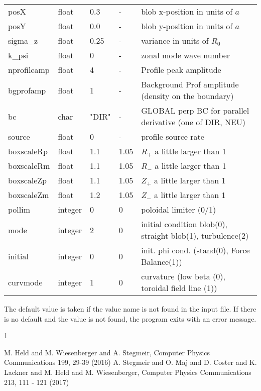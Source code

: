 \documentclass{hitec} %
\renewenvironment{thebibliography}[1]{
  \begin{oldthebibliography}{#1}
    \RaggedRight %
    \setlength{\itemsep}{0em}
    \setlength{\parskip}{0em}
}
{
  \end{oldthebibliography}
}
\begin{document}
\begin{longtable}{llll>{\RaggedRight}p{7cm}}
posX       & float &0.3    & - & blob x-position in units of $a$\\
posY       & float &0.0    & - & blob y-position in units of $a$ \\
sigma\_z    & float &0.25   & - & variance in units of $R_0$  \\
k\_psi     & float &0    & - & zonal mode wave number  \\
nprofileamp& float &4   & - & Profile peak amplitude \\
bgprofamp  & float &1   & - & Background Prof amplitude (density on the boundary) \\
bc  & char & "DIR"      & - & GLOBAL perp BC for parallel derivative (one of  DIR, NEU) \\
source  & float & 0     & - & profile source rate \\
boxscaleRp  & float & 1.1     & 1.05 & $R_+$ a little larger than 1\\
boxscaleRm  & float & 1.1     & 1.05 & $R_-$ a little larger than 1 \\
boxscaleZp  & float & 1.1     & 1.05 & $Z_+$ a little larger than 1 \\
boxscaleZm  & float & 1.2     & 1.05 & $Z_-$ a little larger than 1 \\
pollim    & integer & 0     & 0 & poloidal limiter (0/1) \\
mode      & integer & 2     & 0 & initial condition blob(0), straight blob(1), turbulence(2) \\
initial   & integer & 0     & 0 & init. phi cond. (stand(0), Force Balance(1))\\
curvmode  & integer & 1     & 0 & curvature (low beta (0), toroidal field line (1)) \\
\bottomrule
\end{longtable}
The default value is taken if the value name is not found in the input file. If there is no default and
the value is not found,
the program exits with an error message.
\begin{thebibliography}{1}
  M. Held and M. Wiesenberger and A. Stegmeir,  Computer Physics Communications 199, 29-39 (2016)
  A. Stegmeir and O. Maj and D. Coster and K. Lackner and M. Held and M. Wiesenberger, Computer Physics Communications 213, 111 - 121 (2017)
\end{thebibliography}
\end{document}
